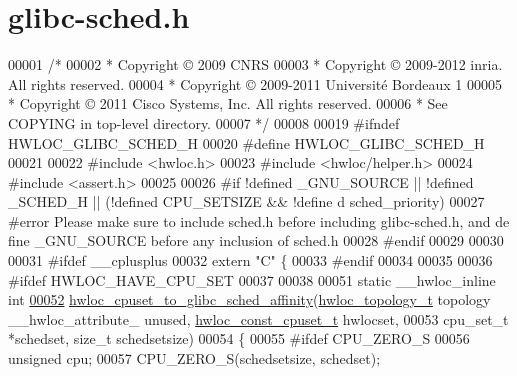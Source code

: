 \hypertarget{a00030_source}{
\section{glibc-\/sched.h}
}

\begin{DoxyCode}
00001 \textcolor{comment}{/*}
00002 \textcolor{comment}{ * Copyright © 2009 CNRS}
00003 \textcolor{comment}{ * Copyright © 2009-2012 inria.  All rights reserved.}
00004 \textcolor{comment}{ * Copyright © 2009-2011 Université Bordeaux 1}
00005 \textcolor{comment}{ * Copyright © 2011 Cisco Systems, Inc.  All rights reserved.}
00006 \textcolor{comment}{ * See COPYING in top-level directory.}
00007 \textcolor{comment}{ */}
00008 
00019 \textcolor{preprocessor}{#ifndef HWLOC\_GLIBC\_SCHED\_H}
00020 \textcolor{preprocessor}{}\textcolor{preprocessor}{#define HWLOC\_GLIBC\_SCHED\_H}
00021 \textcolor{preprocessor}{}
00022 \textcolor{preprocessor}{#include <hwloc.h>}
00023 \textcolor{preprocessor}{#include <hwloc/helper.h>}
00024 \textcolor{preprocessor}{#include <assert.h>}
00025 
00026 \textcolor{preprocessor}{#if !defined \_GNU\_SOURCE || !defined \_SCHED\_H || (!defined CPU\_SETSIZE && !define
      d sched\_priority)}
00027 \textcolor{preprocessor}{}\textcolor{preprocessor}{#error Please make sure to include sched.h before including glibc-sched.h, and de
      fine \_GNU\_SOURCE before any inclusion of sched.h}
00028 \textcolor{preprocessor}{}\textcolor{preprocessor}{#endif}
00029 \textcolor{preprocessor}{}
00030 
00031 \textcolor{preprocessor}{#ifdef \_\_cplusplus}
00032 \textcolor{preprocessor}{}\textcolor{keyword}{extern} \textcolor{stringliteral}{"C"} \{
00033 \textcolor{preprocessor}{#endif}
00034 \textcolor{preprocessor}{}
00035 
00036 \textcolor{preprocessor}{#ifdef HWLOC\_HAVE\_CPU\_SET}
00037 \textcolor{preprocessor}{}
00038 
00051 \textcolor{keyword}{static} \_\_hwloc\_inline \textcolor{keywordtype}{int}
\hypertarget{a00030_source_l00052}{}\hyperlink{a00066_ga39454e6013441d32e58ef4c4fcba7e4b}{00052} \hyperlink{a00066_ga39454e6013441d32e58ef4c4fcba7e4b}{hwloc_cpuset_to_glibc_sched_affinity}(\hyperlink{a00039_ga9d1e76ee15a7dee158b786c30b6a6e38}{hwloc_topology_t} topology \_\_hwloc\_attribute\_
      unused, \hyperlink{a00040_ga1f784433e9b606261f62d1134f6a3b25}{hwloc_const_cpuset_t} hwlocset,
00053                                     cpu\_set\_t *schedset, \textcolor{keywordtype}{size\_t} schedsetsize)
00054 \{
00055 \textcolor{preprocessor}{#ifdef CPU\_ZERO\_S}
00056 \textcolor{preprocessor}{}  \textcolor{keywordtype}{unsigned} cpu;
00057   CPU\_ZERO\_S(schedsetsize, schedset);

\end{DoxyCode}
